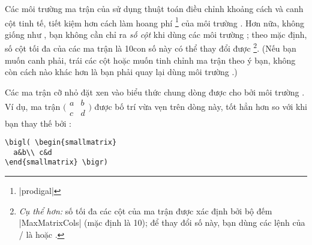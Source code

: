 \documentclass[11pt,leqno,titlepage,openany,oneside]{amsldoc}[1999/12/13]
\begin{document}
\medskip
Các môi trường ma trận của  sử dụng thuật toán
điều chỉnh khoảng cách và canh cột tinh tế, tiết kiệm hơn cách làm hoang phí%
\footnote{|prodigal|} của môi trường .
Hơn nữa, không giống như , bạn không cần chỉ ra \emph{số cột}
khi dùng các môi trường ; theo mặc định, số cột tối đa của
các ma trận là 10\mdash con số này có thể thay đổi được%
\footnote{%
\emph{Cụ thể hơn:} số tối đa các cột của ma trận được xác định bởi bộ đếm |MaxMatrixCols|
(mặc định là 10); để thay đổi số này, bạn dùng các lệnh của \latex/ là
 hoặc .
}.
(Nếu bạn muốn canh phải, trái các cột hoặc muốn tinh chỉnh ma trận theo ý bạn,
không còn cách nào khác hơn là bạn phải quay lại dùng môi trường .)

\medskip
Các ma trận cỡ nhỏ đặt xen vào biểu thức chung dòng được cho bởi
môi trường . Ví dụ, ma trận
\begin{math}
\bigl( \begin{smallmatrix}
  a&b\\ c&d
\end{smallmatrix} \bigr)
\end{math}
được bố trí vừa vẹn trên dòng này, tốt hẳn hơn so
với khi bạn thay thế  bởi :

\medskip
\begin{verbatim}
\bigl( \begin{smallmatrix}
  a&b\\ c&d
\end{smallmatrix} \bigr)
\end{verbatim}
\end{document}
